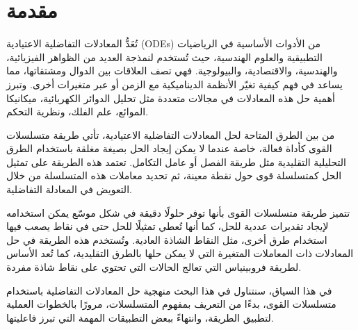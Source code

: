 \chapter*{مقدمة}

تُعَدُّ المعادلات التفاضلية الاعتيادية (ODEs) من الأدوات الأساسية في الرياضيات التطبيقية والعلوم الهندسية، حيث تُستخدم لنمذجة العديد من الظواهر الفيزيائية، والهندسية، والاقتصادية، والبيولوجية. فهي تصف العلاقات بين الدوال ومشتقاتها، مما يساعد في فهم كيفية تغيّر الأنظمة الديناميكية مع الزمن أو عبر متغيرات أخرى. وتبرز أهمية حل هذه المعادلات في مجالات متعددة مثل تحليل الدوائر الكهربائية، ميكانيكا الموائع، علم الفلك، ونظرية التحكم.

\noindent
من بين الطرق المتاحة لحل المعادلات التفاضلية الاعتيادية، تأتي طريقة متسلسلات القوى كأداة فعالة، خاصة عندما لا يمكن إيجاد الحل بصيغة مغلقة باستخدام الطرق التحليلية التقليدية مثل طريقة الفصل أو عامل التكامل. تعتمد هذه الطريقة على تمثيل الحل كمتسلسلة قوى حول نقطة معينة، ثم تحديد معاملات هذه المتسلسلة من خلال التعويض في المعادلة التفاضلية.

\noindent
تتميز طريقة متسلسلات القوى بأنها توفر حلولًا دقيقة في شكل موسّع يمكن استخدامه لإيجاد تقديرات عددية للحل، كما أنها تُعطي تمثيلًا للحل حتى في نقاط يصعب فيها استخدام طرق أخرى، مثل النقاط الشاذة العادية. وتُستخدم هذه الطريقة في حل المعادلات ذات المعاملات المتغيرة التي لا يمكن حلها بالطرق التقليدية، كما تُعد الأساس لطريقة فروبينياس التي تعالج الحالات التي تحتوي على نقاط شاذة مفردة.

\noindent
في هذا السياق، سنتناول في هذا البحث منهجية حل المعادلات التفاضلية باستخدام متسلسلات القوى، بدءًا من التعريف بمفهوم المتسلسلات، مرورًا بالخطوات العملية لتطبيق الطريقة، وانتهاءً ببعض التطبيقات المهمة التي تبرز فاعليتها.


